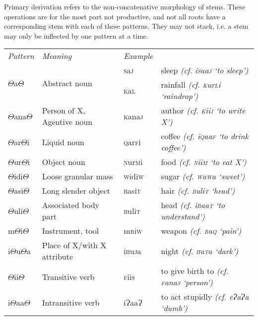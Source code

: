 \documentclass[a4paper,10pt,twoside,openright]{memoir}
\newcommand{\rootpart}{$\Theta$}
\newcommand{\bigglot}{Ɂ}
\newcommand{\famword}[5]{#1\textsc{#2}#3\textsc{#4}#5}
\begin{document}
Primary derivation refers to the non-concatenative morphology of stems. These operations are for the most part not productive, and not all roots have a corresponding stem with each of these patterns. They may not stack, i.e. a stem may only be inflected by one pattern at a time.

\begin{table}[ht]
    \centering
    \begin{tabular}{llll}
    \textit{Pattern} & \textit{Meaning} & \textit{Example} & \\
    \multirow{2}{*}{{\rootpart}a{\rootpart}} & \multirow{2}{*}{Abstract noun}& \famword{}{s}{a}{j}{} & sleep \emph{(cf. i\textsc{s}aa\textsc{j} `to sleep')}\\
    & & \famword{}{k}{a}{l}{} & rainfall \emph{(cf. \textsc{k}ur\textsc{l}i `raindrop')}\\
    {\rootpart}ana{\rootpart} & Person of X, Agentive noun & \famword{}{k}{ana}{j}{} & author \emph{(cf. \textsc{k}ii\textsc{j} `to write X')}\\
    {\rootpart}ar{\rootpart}i & Liquid noun & \famword{}{q}{ar}{f}{i} & coffee \emph{(cf. i\textsc{q}aa\textsc{f} `to drink coffee')} \\
    {\rootpart}ur{\rootpart}i & Object noun & \famword{}{n}{ur}{m}{i} & food \emph{(cf. \textsc{n}ii\textsc{m} `to eat X')}\\
    {\rootpart}idi{\rootpart} & Loose granular mass & \famword{}{w}{idi}{w}{} & sugar \emph{(cf. \textsc{w}a\textsc{w}a `sweet')} \\
    {\rootpart}asi{\rootpart} & Long slender object & \famword{}{b}{asi}{t}{} & hair \emph{(cf. \textsc{b}uli\textsc{t} `head')} \\
    {\rootpart}uli{\rootpart} & Associated body part & \famword{}{b}{uli}{t}{} & head \emph{(cf. i\textsc{b}aa\textsc{t} `to understand')}\\
    m{\rootpart}i{\rootpart} & Instrument, tool & \famword{m}{r}{i}{w}{} & weapon \emph{(cf. \textsc{r}a\textsc{q} `pain')} \\
    i{\rootpart}u{\rootpart}a & Place of X/with X attribute & \famword{i}{h}{u}{j}{a} & night \emph{(cf. \textsc{h}a\textsc{t}a `dark')} \\
    {\rootpart}ii{\rootpart} & Transitive verb & \famword{}{f}{ii}{s}{} & to give birth to \emph{(cf. \textsc{f}ana\textsc{s} `person')} \\
    i{\rootpart}aa{\rootpart} & Intransitive verb & \famword{i}{\bigglot}{aa}{\bigglot}{} & to act stupidly \emph{(cf. e\bigglot a\bigglot a `dumb')} \\

\end{tabular}
\end{table}
\end{document}
